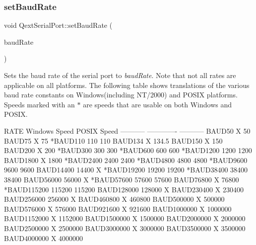 \subsubsection{\texorpdfstring{set\+Baud\+Rate}{setBaudRate}}
{\footnotesize\ttfamily void Qext\+Serial\+Port\+::set\+Baud\+Rate (\begin{DoxyParamCaption}\item[{Baud\+Rate\+Type}]{baud\+Rate }\end{DoxyParamCaption})\hspace{0.3cm}{\ttfamily [slot]}}

Sets the baud rate of the serial port to {\itshape baud\+Rate}. Note that not all rates are applicable on all platforms. The following table shows translations of the various baud rate constants on Windows(including N\+T/2000) and P\+O\+S\+IX platforms. Speeds marked with an $\ast$ are speeds that are usable on both Windows and P\+O\+S\+IX. 
\begin{DoxyCode}
RATE          Windows Speed   POSIX Speed
-----------   -------------   -----------
 BAUD50                   X          50
 BAUD75                   X          75
*BAUD110                110         110
 BAUD134                  X         134.5
 BAUD150                  X         150
 BAUD200                  X         200
*BAUD300                300         300
*BAUD600                600         600
*BAUD1200              1200        1200
 BAUD1800                 X        1800
*BAUD2400              2400        2400
*BAUD4800              4800        4800
*BAUD9600              9600        9600
 BAUD14400            14400           X
*BAUD19200            19200       19200
*BAUD38400            38400       38400
 BAUD56000            56000           X
*BAUD57600            57600       57600
 BAUD76800                X       76800
*BAUD115200          115200      115200
 BAUD128000          128000           X
 BAUD230400               X      230400
 BAUD256000          256000           X
 BAUD460800               X      460800
 BAUD500000               X      500000
 BAUD576000               X      576000
 BAUD921600               X      921600
 BAUD1000000              X     1000000
 BAUD1152000              X     1152000
 BAUD1500000              X     1500000
 BAUD2000000              X     2000000
 BAUD2500000              X     2500000
 BAUD3000000              X     3000000
 BAUD3500000              X     3500000
 BAUD4000000              X     4000000
\end{DoxyCode}
 \mbox{\label{classQextSerialPort_aec2dde714ac2e085d264caba18cc4eb6}} 
